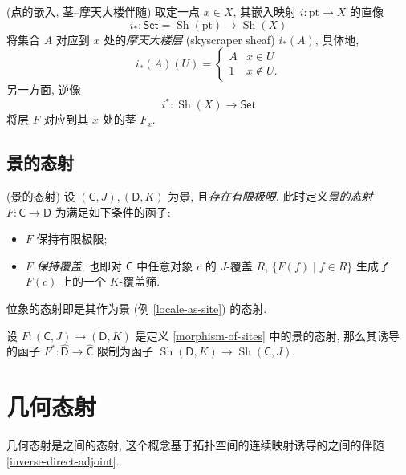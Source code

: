 \begin{example}
    {(点的嵌入, 茎--摩天大楼伴随)}
    取定一点 $x\in X$, 其嵌入映射 $i \colon \text{pt} \to X$ 的直像
    $$i_* \colon \mathsf {Set} = \operatorname{Sh}(\text{pt}) \to \operatorname{Sh}(X)$$
    将集合 $A$ 对应到 $x$ 处的\emph{摩天大楼层} (skyscraper sheaf) $i_*(A)$,
    具体地,
    $$
    i_*(A) (U) = \begin{cases}
        A & x\in U\\
        1 & x\notin U.
    \end{cases}
    $$
    另一方面, 逆像 $$i^* \colon \operatorname{Sh}(X) \to \mathsf {Set}$$ 将层 $F$ 对应到其 $x$ 处的茎 $F_x$.
    
\end{example}

\subsection{景的态射}

\begin{definition}
	[label={morphism-of-sites}]
	{(景的态射)}
	设 $(\mathsf C,J),(\mathsf D,K)$ 为景, 且\emph{存在有限极限}. 此时定义\emph{景的态射} $F\colon \mathsf C\to\mathsf D$ 为满足如下条件的函子:
	\begin{itemize}
		\item $F$ 保持有限极限;
		\item $F$ \emph{保持覆盖}, 也即对 $\mathsf C$ 中任意对象 $c$ 的 $J$-覆盖 $R$, $\{F(f)\mid f\in R\}$ 生成了 $F(c)$ 上的一个 $K$-覆盖筛.
	\end{itemize}
\end{definition}

\begin{example}
	{}
	位象的态射即是其作为景 (例 \ref{locale-as-site}) 的态射.
\end{example}

\begin{prop}
	{}
	设 $F\colon (\mathsf C,J)\to (\mathsf D,K)$ 是定义 \ref{morphism-of-sites} 中的景的态射,
	那么其诱导的函子 $F^*\colon \widehat {\mathsf D} \to \widehat {\mathsf C}$ 限制为函子 $\operatorname{Sh}(\mathsf D,K) \to \operatorname{Sh}(\mathsf C,J)$.
\end{prop}

\section{几何态射}

几何态射是\topos{}之间的态射, 这个概念基于拓扑空间的连续映射诱导的\topos{}之间的伴随 \ref{inverse-direct-adjoint}.

